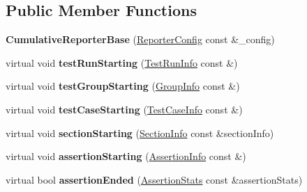 \subsection*{Public Member Functions}
\begin{DoxyCompactItemize}
\item 
\hypertarget{struct_catch_1_1_cumulative_reporter_base_ae25c7146268ae81fa0f944481d7ea5a5}{{\bfseries Cumulative\-Reporter\-Base} (\hyperlink{struct_catch_1_1_reporter_config}{Reporter\-Config} const \&\-\_\-config)}\label{struct_catch_1_1_cumulative_reporter_base_ae25c7146268ae81fa0f944481d7ea5a5}

\item 
\hypertarget{struct_catch_1_1_cumulative_reporter_base_a6326c26db277590f1d261953fd4b6733}{virtual void {\bfseries test\-Run\-Starting} (\hyperlink{struct_catch_1_1_test_run_info}{Test\-Run\-Info} const \&)}\label{struct_catch_1_1_cumulative_reporter_base_a6326c26db277590f1d261953fd4b6733}

\item 
\hypertarget{struct_catch_1_1_cumulative_reporter_base_a43f07792f2de8dce50ac0a24dbda6f5a}{virtual void {\bfseries test\-Group\-Starting} (\hyperlink{struct_catch_1_1_group_info}{Group\-Info} const \&)}\label{struct_catch_1_1_cumulative_reporter_base_a43f07792f2de8dce50ac0a24dbda6f5a}

\item 
\hypertarget{struct_catch_1_1_cumulative_reporter_base_affa61c6fb32e28a388afa45aa492c265}{virtual void {\bfseries test\-Case\-Starting} (\hyperlink{struct_catch_1_1_test_case_info}{Test\-Case\-Info} const \&)}\label{struct_catch_1_1_cumulative_reporter_base_affa61c6fb32e28a388afa45aa492c265}

\item 
\hypertarget{struct_catch_1_1_cumulative_reporter_base_a65bfe4710217c2d3eed5efe389adcd77}{virtual void {\bfseries section\-Starting} (\hyperlink{struct_catch_1_1_section_info}{Section\-Info} const \&section\-Info)}\label{struct_catch_1_1_cumulative_reporter_base_a65bfe4710217c2d3eed5efe389adcd77}

\item 
\hypertarget{struct_catch_1_1_cumulative_reporter_base_a7b5dfe0f0597083e686066ce7aeaaf35}{virtual void {\bfseries assertion\-Starting} (\hyperlink{struct_catch_1_1_assertion_info}{Assertion\-Info} const \&)}\label{struct_catch_1_1_cumulative_reporter_base_a7b5dfe0f0597083e686066ce7aeaaf35}

\item 
\hypertarget{struct_catch_1_1_cumulative_reporter_base_a22c7dfc613e911f97c621e436cde016c}{virtual bool {\bfseries assertion\-Ended} (\hyperlink{struct_catch_1_1_assertion_stats}{Assertion\-Stats} const \&assertion\-Stats)}\label{struct_catch_1_1_cumulative_reporter_base_a22c7dfc613e911f97c621e436cde016c}


\end{DoxyCompactItemize}
